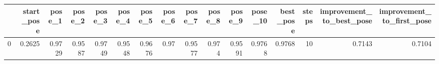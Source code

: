 \begin{tabular}{lrrrrrrrrrrrrrrr}
\toprule
{} &  start\_pose &  pose\_1 &  pose\_2 &  pose\_3 &  pose\_4 &  pose\_5 &  pose\_6 &  pose\_7 &  pose\_8 &  pose\_9 &  pose\_10 &  best\_pose &  steps &  improvement\_to\_best\_pose &  improvement\_to\_first\_pose \\
\midrule
0 &      0.2625 &  0.9729 &  0.9587 &  0.9749 &  0.9548 &  0.9676 &    0.97 &  0.9577 &   0.974 &  0.9591 &   0.9768 &     0.9768 &     10 &                    0.7143 &                     0.7104 \\
\bottomrule
\end{tabular}
